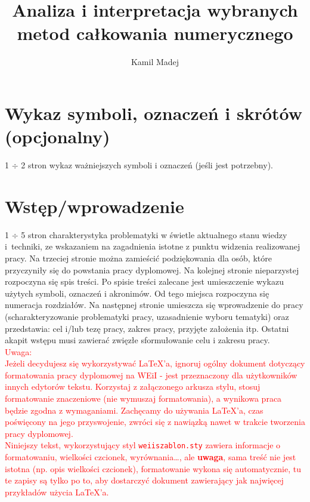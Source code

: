 \documentclass[12pt,twoside]{article}
\author{Kamil Madej}
\title{Analiza i interpretacja wybranych metod całkowania numerycznego}
\begin{document}
\maketitle

\blankpage

\tableofcontents

\clearpage
\blankpage


\section*{Wykaz symboli, oznaczeń i skrótów (opcjonalny)}
%

1 $\div$ 2 stron wykaz ważniejszych symboli i oznaczeń (jeśli jest potrzebny).
\clearpage

\section{Wstęp/wprowadzenie}
1 $\div$ 5 stron charakterystyka problematyki w świetle aktualnego stanu wiedzy i~techniki, ze wskazaniem na zagadnienia istotne z punktu widzenia realizowanej pracy.
Na trzeciej stronie można zamieścić podziękowania dla osób, które przyczyniły się do powstania pracy dyplomowej. Na kolejnej stronie nieparzystej rozpoczyna się spis treści. Po spisie treści zalecane jest umieszczenie wykazu użytych symboli, oznaczeń i akronimów. Od tego miejsca rozpoczyna się numeracja rozdziałów. Na następnej stronie umieszcza się wprowadzenie do pracy (scharakteryzowanie problematyki pracy, uzasadnienie wyboru tematyki) oraz przedstawia: cel i/lub tezę pracy, zakres pracy, przyjęte założenia itp.
Ostatni akapit wstępu musi zawierać zwięzłe sformułowanie celu i zakresu pracy. 
\\
\textcolor{red}{
Uwaga: \\
Jeżeli decydujesz się wykorzystywać \LaTeX'a, ignoruj ogólny dokument dotyczący formatowania pracy dyplomowej na WEiI - jest przeznaczony dla użytkowników innych edytorów tekstu. Korzystaj z załączonego arkusza stylu, stosuj formatowanie znaczeniowe (nie wymuszaj formatowania), a wynikowa praca będzie zgodna z wymaganiami. Zachęcamy do używania \LaTeX'a, czas poświęcony na jego przyswojenie, zwróci się z nawiązką nawet w trakcie tworzenia pracy dyplomowej. \\
Niniejszy tekst, wykorzystujący  styl \texttt{weiiszablon.sty} zawiera informacje o formatowaniu, wielkości czcionek, wyrównania\ldots, ale \textbf{uwaga}, sama treść nie jest istotna (np. opis wielkości czcionek), 
formatowanie wykona się automatycznie, tu te zapisy są tylko po to, aby dostarczyć dokument zawierający jak najwięcej przykładów użycia \LaTeX'a.
}
\end{document}
